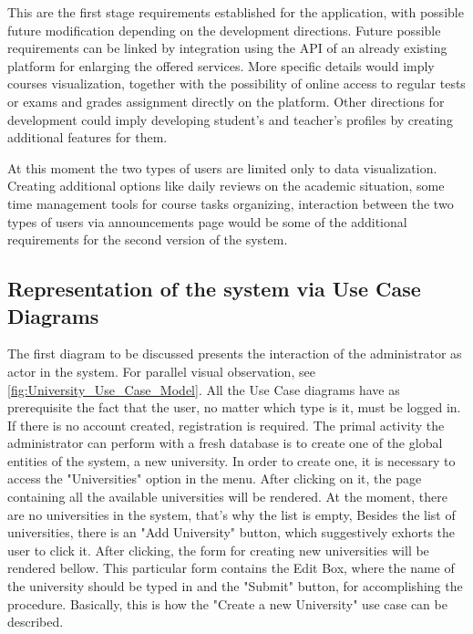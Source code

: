 This are the first stage requirements established for the application, with possible future modification depending on the development directions. Future possible requirements can be linked by integration using the API of an already existing platform for enlarging the offered services. More specific details would imply courses visualization, together with the possibility of online access to regular tests or exams and grades assignment directly on the platform. Other directions for development could imply developing student's and teacher's profiles by creating additional features for them. 

At this moment the two types of users are limited only to data visualization. Creating additional options like daily reviews on the academic situation, some time management tools for course tasks organizing, interaction between the two types of users via announcements page would be some of the additional requirements for the second version of the system.

\subsection{Representation of the system via Use Case Diagrams}
The first diagram to be discussed presents the interaction of the administrator as actor in the system. For parallel visual observation, see \autoref{fig:University_Use_Case_Model}. All the Use Case diagrams have as prerequisite the fact that the user, no matter which type is it, must be logged in. If there is no account created, registration is required. The primal activity the administrator can perform with a fresh database is to create one of the global entities of the system, a new university. In order to create one, it is necessary to access the "Universities" option in the menu. After clicking on it, the page containing all the available universities will be rendered. At the moment, there are no universities in the system, that's why the list is empty, Besides the list of universities, there is an "Add University" button, which suggestively exhorts the user to click it. After clicking, the form for creating new universities will be rendered bellow. This particular form contains the Edit Box, where the name of the university should be typed in and the "Submit" button, for accomplishing the procedure. Basically, this is how the "Create a new University" use case can be described. 

